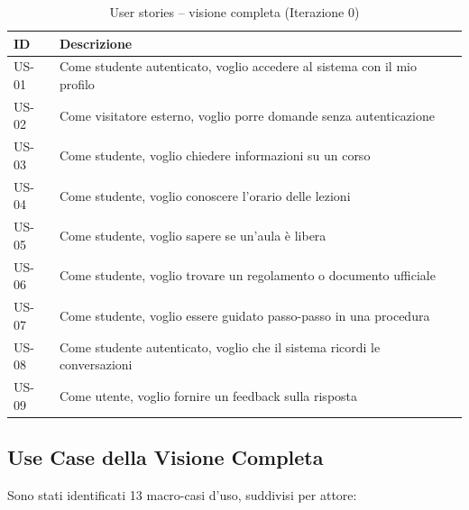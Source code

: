 \documentclass[a4paper,12pt]{report}
\begin{document}
\begin{table}[H]
\centering
\begin{tabularx}{\textwidth}{l X}
\toprule
\textbf{ID} & \textbf{Descrizione} \\
\midrule
US-01 & Come studente autenticato, voglio accedere al sistema con il mio profilo \\
US-02 & Come visitatore esterno, voglio porre domande senza autenticazione \\
US-03 & Come studente, voglio chiedere informazioni su un corso \\
US-04 & Come studente, voglio conoscere l'orario delle lezioni \\
US-05 & Come studente, voglio sapere se un'aula è libera \\
US-06 & Come studente, voglio trovare un regolamento o documento ufficiale \\
US-07 & Come studente, voglio essere guidato passo-passo in una procedura \\
US-08 & Come studente autenticato, voglio che il sistema ricordi le conversazioni \\
US-09 & Come utente, voglio fornire un feedback sulla risposta \\
\bottomrule
\end{tabularx}
\caption{User stories -- visione completa (Iterazione 0)}
\end{table}

\subsection{Use Case della Visione Completa}

Sono stati identificati 13 macro-casi d'uso, suddivisi per attore:
\end{document}
